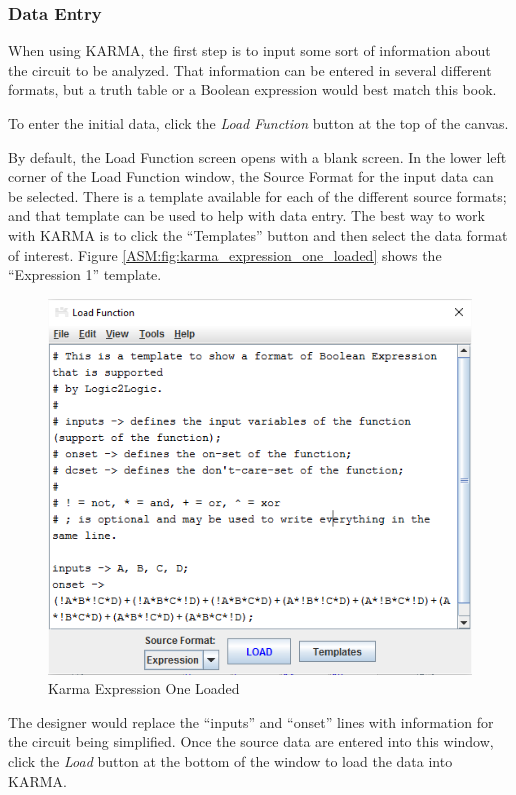 \subsubsection{Data Entry}
\label{ASM:subsubsec:karma_data_entry}

When using \ac{KARMA}, the first step is to input some sort of information about the circuit to be analyzed. That information can be entered in several different formats, but a truth table or a Boolean expression would best match this book. 

To enter the initial data, click the \emph{Load Function} button at the top of the canvas.

By default, the Load Function screen opens with a blank screen. In the lower left corner of the Load Function window, the Source Format for the input data can be selected. There is a template available for each of the different source formats; and that template can be used to help with data entry. The best way to work with \ac{KARMA} is to click the ``Templates'' button and then select the data format of interest. Figure \ref{ASM:fig:karma_expression_one_loaded} shows the ``Expression 1'' template. 

\begin{figure}[H]
	\centering
	\includegraphics[width=\maxwidth{.95\linewidth}]{gfx/07_03}
	\caption{Karma Expression One Loaded}
	\label{fig:07_03}
\end{figure}

The designer would replace the ``inputs'' and ``onset'' lines with information for the circuit being simplified. Once the source data are entered into this window, click the \emph{Load} button at the bottom of the window to load the data into \ac{KARMA}. 

